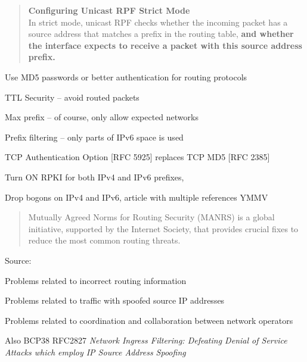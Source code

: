 \documentclass[Screen16to9,17pt]{foils}
\newcommand{\myalert}{\color{red}\faFlag}
\begin{document}
\begin{quote}
{\bf Configuring Unicast RPF Strict Mode}\\
In strict mode, unicast RPF checks whether the incoming packet has a source address that matches a prefix in the routing table, {\bf and whether the interface expects to receive a packet with this source address prefix.}
\end{quote}







\begin{list2}
\item Use MD5 passwords or better authentication for routing protocols {\myalert}
\item TTL Security -- avoid routed packets
\item Max prefix -- of course, only allow expected networks
\item Prefix filtering -- only parts of IPv6 space is used
\item TCP Authentication Option [RFC 5925] replaces TCP MD5 [RFC 2385]
\item Turn ON RPKI for both IPv4 and IPv6 prefixes, {\myalert} \\
\item Drop bogons on IPv4 and IPv6, article with multiple references YMMV\\
\end{list2}




\begin{quote}
  Mutually Agreed Norms for Routing Security (MANRS) is a global initiative, supported by the Internet Society, that provides crucial fixes to reduce the most common routing threats. ﻿
\end{quote}
Source: {\small{}}

\begin{list2}
\item Problems related to incorrect routing information
\item Problems related to traffic with spoofed source IP addresses
\item Problems related to coordination and collaboration between network operators
\item Also BCP38 RFC2827 \emph{Network Ingress Filtering: Defeating Denial of Service Attacks
which employ IP Source Address Spoofing}
\end{list2}
\end{document}
